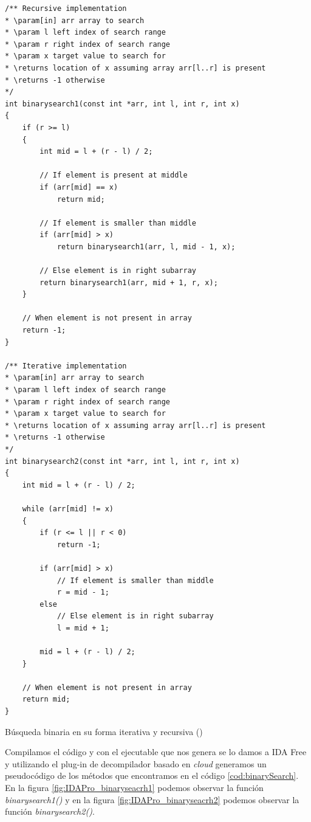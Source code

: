 \begin{mycode}
    \begin{verbatim}
/** Recursive implementation
* \param[in] arr array to search
* \param l left index of search range
* \param r right index of search range
* \param x target value to search for
* \returns location of x assuming array arr[l..r] is present
* \returns -1 otherwise
*/
int binarysearch1(const int *arr, int l, int r, int x)
{
    if (r >= l)
    {
        int mid = l + (r - l) / 2;

        // If element is present at middle
        if (arr[mid] == x)
            return mid;

        // If element is smaller than middle
        if (arr[mid] > x)
            return binarysearch1(arr, l, mid - 1, x);

        // Else element is in right subarray
        return binarysearch1(arr, mid + 1, r, x);
    }

    // When element is not present in array
    return -1;
}

/** Iterative implementation
* \param[in] arr array to search
* \param l left index of search range
* \param r right index of search range
* \param x target value to search for
* \returns location of x assuming array arr[l..r] is present
* \returns -1 otherwise
*/
int binarysearch2(const int *arr, int l, int r, int x)
{
    int mid = l + (r - l) / 2;

    while (arr[mid] != x)
    {
        if (r <= l || r < 0)
            return -1;

        if (arr[mid] > x)
            // If element is smaller than middle
            r = mid - 1;
        else
            // Else element is in right subarray
            l = mid + 1;

        mid = l + (r - l) / 2;
    }

    // When element is not present in array
    return mid;
}
    \end{verbatim}
    \caption[Búsqueda binaria en su forma iterativa y recursiva]{Búsqueda binaria en su forma iterativa y recursiva (\cite{BinarySearchGitHub})}
    \label{cod:binarySearch}
\end{mycode}

Compilamos el código y con el ejecutable que nos genera se lo damos a IDA Free y
utilizando el plug-in de decompilador basado en \textit{cloud} generamos un
pseudocódigo de los métodos que encontramos en el código \ref{cod:binarySearch}.
En la figura \ref{fig:IDAPro_binaryseacrh1} podemos observar la función \textit{binarysearch1()}
y en la figura \ref{fig:IDAPro_binaryseacrh2} podemos observar la función \textit{binarysearch2()}.

